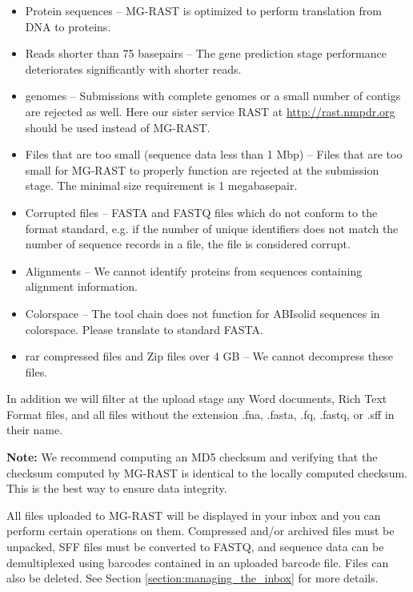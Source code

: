 \documentclass[12pt,fullpage]{report}
\begin{document}
\begin{itemize}
\item Protein sequences --
MG-RAST is optimized to perform translation from DNA to proteins.

\item Reads shorter than 75 basepairs --
The gene prediction stage performance deteriorates significantly with shorter reads.

\item genomes --
Submissions with complete genomes or a small number of contigs are rejected as well. Here our sister service RAST at \url{http://rast.nmpdr.org} should be used instead of MG-RAST.

\item Files that are too small (sequence data less than 1 Mbp) --
Files that are too small for MG-RAST to properly function are rejected at the submission stage. The minimal size requirement is 1 megabasepair.

\item Corrupted files --
FASTA and FASTQ files which do not conform to the format standard, e.g. if the number of unique identifiers does not match the number of sequence records in a file, the file is considered corrupt.

\item Alignments --
We cannot identify proteins from sequences containing alignment information.

\item Colorspace --
The tool chain does not function for ABIsolid sequences in colorspace. Please translate to standard FASTA.

\item rar compressed files and Zip files over 4 GB --
We cannot decompress these files.

\end{itemize}

In addition we will filter at the upload stage any Word documents, Rich Text Format files, and all
files without the extension .fna, .fasta, .fq, .fastq, or .sff in their name.


\textbf{Note:} We recommend computing an \gls{MD5} checksum and verifying that the checksum computed by MG-RAST is identical to the locally computed checksum. This is the best way to ensure data integrity.

All files uploaded to MG-RAST will be displayed in your inbox and you can perform certain operations on them. Compressed and/or archived files must be unpacked, SFF files must be converted to FASTQ, and sequence data can be demultiplexed using barcodes contained in an uploaded barcode file. Files can also be deleted. See Section \ref{section:managing_the_inbox} for more details.
\end{document}
